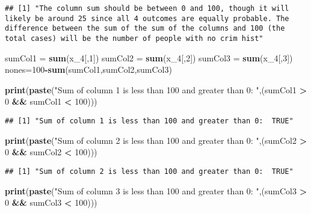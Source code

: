 \documentclass[]{article}
\newenvironment{Shaded}{\begin{snugshade}}{\end{snugshade}}
\newcommand{\KeywordTok}[1]{\textcolor[rgb]{0.13,0.29,0.53}{\textbf{#1}}}
\newcommand{\DecValTok}[1]{\textcolor[rgb]{0.00,0.00,0.81}{#1}}
\newcommand{\StringTok}[1]{\textcolor[rgb]{0.31,0.60,0.02}{#1}}
\newcommand{\OperatorTok}[1]{\textcolor[rgb]{0.81,0.36,0.00}{\textbf{#1}}}
\newcommand{\NormalTok}[1]{#1}
\begin{document}
\begin{verbatim}
## [1] "The column sum should be between 0 and 100, though it will likely be around 25 since all 4 outcomes are equally probable. The difference between the sum of the sum of the columns and 100 (the total cases) will be the number of people with no crim hist"
\end{verbatim}

\begin{Shaded}
\begin{Highlighting}[]
\NormalTok{sumCol1 =}\StringTok{ }\KeywordTok{sum}\NormalTok{(x_}\DecValTok{4}\NormalTok{[,}\DecValTok{1}\NormalTok{])}
\NormalTok{sumCol2 =}\StringTok{ }\KeywordTok{sum}\NormalTok{(x_}\DecValTok{4}\NormalTok{[,}\DecValTok{2}\NormalTok{])}
\NormalTok{sumCol3 =}\StringTok{ }\KeywordTok{sum}\NormalTok{(x_}\DecValTok{4}\NormalTok{[,}\DecValTok{3}\NormalTok{])}
\NormalTok{nones=}\DecValTok{100}\OperatorTok{-}\KeywordTok{sum}\NormalTok{(sumCol1,sumCol2,sumCol3)}

\KeywordTok{print}\NormalTok{(}\KeywordTok{paste}\NormalTok{(}\StringTok{"Sum of column 1 is less than 100 and greater than 0: "}\NormalTok{,(sumCol1 }\OperatorTok{>}\StringTok{ }\DecValTok{0} \OperatorTok{&&}\StringTok{ }\NormalTok{sumCol1 }\OperatorTok{<}\StringTok{ }\DecValTok{100}\NormalTok{)))}
\end{Highlighting}
\end{Shaded}

\begin{verbatim}
## [1] "Sum of column 1 is less than 100 and greater than 0:  TRUE"
\end{verbatim}

\begin{Shaded}
\begin{Highlighting}[]
\KeywordTok{print}\NormalTok{(}\KeywordTok{paste}\NormalTok{(}\StringTok{"Sum of column 2 is less than 100 and greater than 0: "}\NormalTok{,(sumCol2 }\OperatorTok{>}\StringTok{ }\DecValTok{0} \OperatorTok{&&}\StringTok{ }\NormalTok{sumCol2 }\OperatorTok{<}\StringTok{ }\DecValTok{100}\NormalTok{)))}
\end{Highlighting}
\end{Shaded}

\begin{verbatim}
## [1] "Sum of column 2 is less than 100 and greater than 0:  TRUE"
\end{verbatim}

\begin{Shaded}
\begin{Highlighting}[]
\KeywordTok{print}\NormalTok{(}\KeywordTok{paste}\NormalTok{(}\StringTok{"Sum of column 3 is less than 100 and greater than 0: "}\NormalTok{,(sumCol3 }\OperatorTok{>}\StringTok{ }\DecValTok{0} \OperatorTok{&&}\StringTok{ }\NormalTok{sumCol3 }\OperatorTok{<}\StringTok{ }\DecValTok{100}\NormalTok{)))}
\end{Highlighting}
\end{Shaded}
\end{document}

